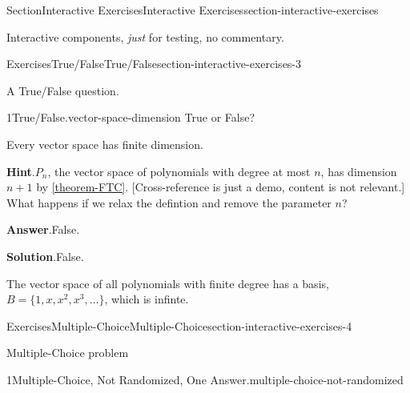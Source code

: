 \documentclass[twoside,10pt,]{article}
\newcommand{\blocktitlefont}{\relax}
\newcommand{\xreffont}{\relax}
\numberwithin{equation}{section}
\begin{document}
\begin{sectionptx}{Section}{Interactive Exercises}{}{Interactive Exercises}{}{}{section-interactive-exercises}
\begin{introduction}{}%
Interactive components, \emph{just} for testing, no commentary.%
\end{introduction}%
%
%
\typeout{************************************************}
\typeout{************************************************}
%
\begin{exercises-subsection}{Exercises}{True\slash{}False}{}{True\slash{}False}{}{}{section-interactive-exercises-3}
\begin{introduction}{}%
A True\slash{}False question.%
\end{introduction}%
\begin{divisionexercise}{1}{True\slash{}False.}{}{vector-space-dimension}%
%
True or False?%
\par
Every vector space has finite dimension.%
\par\smallskip%
\noindent\textbf{\blocktitlefont Hint}.\hypertarget{vector-space-dimension-4}{}\quad{}\(P_n\), the vector space of polynomials with degree at most \(n\), has dimension \(n+1\) by \hyperref[theorem-FTC]{{\xreffont\ref{theorem-FTC}}}.  [Cross-reference is just a demo, content is not relevant.]  What happens if we relax the defintion and remove the parameter \(n\)?%
\par\smallskip%
\noindent\textbf{\blocktitlefont Answer}.\hypertarget{vector-space-dimension-5}{}\quad{}False.%
\par\smallskip%
\noindent\textbf{\blocktitlefont Solution}.\hypertarget{vector-space-dimension-6}{}\quad{}False.%
\par
The vector space of all polynomials with finite degree has a basis, \(B = \{1,x,x^2,x^3,\dots\}\), which is infinte.%
\end{divisionexercise}%
\end{exercises-subsection}
%
%
\typeout{************************************************}
\typeout{************************************************}
%
\begin{exercises-subsection}{Exercises}{Multiple-Choice}{}{Multiple-Choice}{}{}{section-interactive-exercises-4}
\begin{introduction}{}%
Multiple-Choice problem%
\end{introduction}%
\begin{divisionexercise}{1}{Multiple-Choice, Not Randomized, One Answer.}{}{multiple-choice-not-randomized}%

\end{divisionexercise}
\end{exercises-subsection}
\end{sectionptx}
\end{document}
